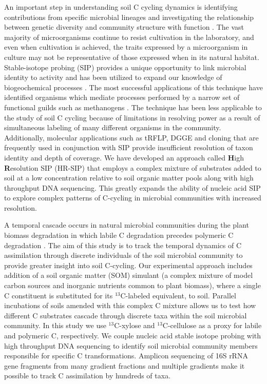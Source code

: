 An important step in understanding soil C cycling dynamics is identifying
contributions from specific microbial lineages and investigating the
relationship between genetic diversity and community structure with function
\citep{O_Donnell_2002}. The vast majority of microorganisms continue to resist
cultivation in the laboratory, and even when cultivation is achieved, the
traits expressed by a microorganism in culture may not be representative of
those expressed when in its natural habitat. Stable-isotope probing (SIP)
provides a unique opportunity to link microbial identity to activity and has
been utilized to expand our knowledge of biogeochemical processes
\citep{Chen_Murrell_2010}. The most successful applications of this technique
have identified organisms which mediate processes performed by a narrow set of
functional guilds such as methanogens \citep{Lu_2005}. The technique has been
less applicable to the study of soil C cycling because of limitations in
resolving power as a result of simultaneous labeling of many different
organisms in the community. Additionally, molecular applications such as tRFLP,
DGGE and cloning that are frequently used in conjunction with SIP provide
insufficient resolution of taxon identity and depth of coverage. We have
developed an approach called \textbf{H}igh \textbf{R}esolution SIP (HR-SIP)
that employs a complex mixture of substrates added to soil at a low
concentration relative to soil organic matter pools along with high throughput
DNA sequencing. This greatly expands the ability of nucleic acid SIP to explore
complex patterns of C-cycling in microbial communities with increased
resolution.

A temporal cascade occurs in natural microbial communities during the plant
biomass degradation in which labile C degradation precedes polymeric C
degradation \citep{Hu_1997,Rui_2009}.  The aim of this study is to track the
temporal dynamics of C assimilation through discrete individuals of the soil
microbial community to provide greater insight into soil C-cycling.  Our
experimental approach includes addition of a soil organic matter (SOM) simulant
(a complex mixture of model carbon sources and inorganic nutrients common to
plant biomass), where a single C constituent is substituted for its
$^{13}$C-labeled equivalent, to soil.  Parallel incubations of soils amended
with this complex C mixture allows us to test how different C substrates
cascade through discrete taxa within the soil microbial community.  In this
study we use $^{13}$C-xylose and $^{13}$C-cellulose as a proxy for labile and
polymeric C, respectively.  We couple nucleic acid stable isotope probing with
high throughput DNA sequencing to identify soil microbial community members
responsible for specific C transformations.  Amplicon sequencing of 16S rRNA
gene fragments from many gradient fractions and multiple gradients make it
possible to track C assimilation by hundreds of taxa.
